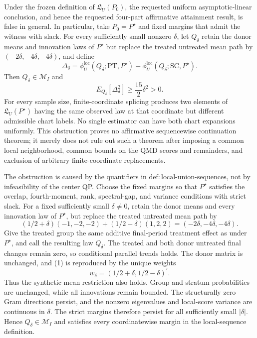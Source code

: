 Under the frozen definition of \(\mathfrak L_U(P_0)\), the requested uniform asymptotic-linear conclusion, and hence the requested four-part affirmative attainment result, is false in general. In particular, take \(P_0=P^{\star}\) and fixed margins that admit the witness with slack. For every sufficiently small nonzero \(\delta\), let \(Q_\delta\) retain the donor means and innovation laws of \(P^{\star}\) but replace the treated untreated mean path by \((-2\delta,-4\delta,-4\delta)\), and define
\[
 \Delta_\delta
 =\phi_U^{\mathrm{loc}}(Q_\delta;\mathrm{PT},P^{\star})
  -\phi_U^{\mathrm{loc}}(Q_\delta;\mathrm{SC},P^{\star}).
\]
Then \(Q_\delta\in\mathcal M_I\) and
\[
 E_{Q_\delta}[\Delta_\delta^2]\ge\frac{15}{2}\delta^2>0.
\]
For every sample size, finite-coordinate splicing produces two elements of \(\mathfrak L_U(P^{\star})\) having the same observed law at that coordinate but different admissible chart labels. No single estimator can have both chart expansions uniformly. This obstruction proves no affirmative sequencewise continuation theorem; it merely does not rule out such a theorem after imposing a common local neighborhood, common bounds on the QMD scores and remainders, and exclusion of arbitrary finite-coordinate replacements.

The obstruction is caused by the quantifiers in \(\mathrm{def{:}local\text{-}union\text{-}sequences}\), not by infeasibility of the center QP. Choose the fixed margins so that \(P^{\star}\) satisfies the overlap, fourth-moment, rank, spectral-gap, and variance conditions with strict slack. For a fixed sufficiently small \(\delta\ne0\), retain the donor means and every innovation law of \(P^{\star}\), but replace the treated untreated mean path by
\[
 (1/2+\delta)(-1,-2,-2)+(1/2-\delta)(1,2,2)
 =(-2\delta,-4\delta,-4\delta).
 \tag{1}
\]
Give the treated group the same additive final-period treatment effect as under \(P^{\star}\), and call the resulting law \(Q_\delta\). The treated and both donor untreated final changes remain zero, so conditional parallel trends holds. The donor matrix is unchanged, and (1) is reproduced by the unique weights
\[
 w_\delta=(1/2+\delta,1/2-\delta)^{\prime}.
 \tag{2}
\]
Thus the synthetic-mean restriction also holds. Group and stratum probabilities are unchanged, while all innovations remain bounded. The structurally zero Gram directions persist, and the nonzero eigenvalues and local-score variance are continuous in \(\delta\). The strict margins therefore persist for all sufficiently small \(|\delta|\). Hence \(Q_\delta\in\mathcal M_I\) and satisfies every coordinatewise margin in the local-sequence definition.

